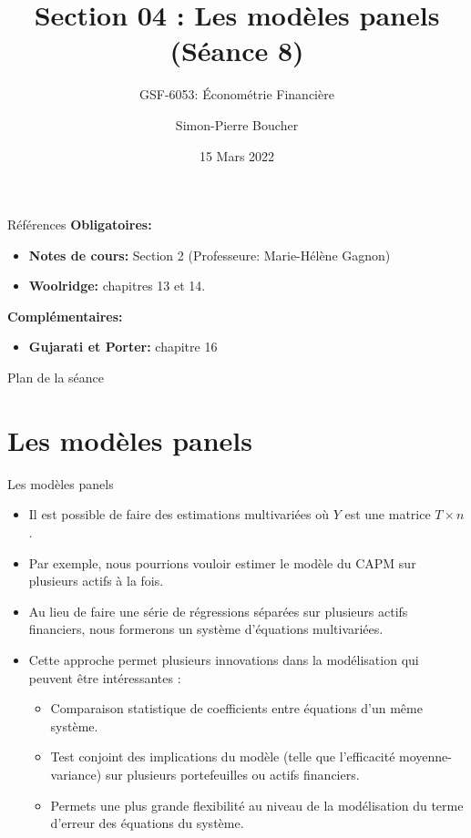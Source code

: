 \documentclass{beamer}
\title[S02 Régression et MCO]{Section 04 : Les modèles panels\\ (Séance 8)}
\subtitle{GSF-6053: Économétrie Financière}
\author[SP. Boucher]{Simon-Pierre Boucher\inst{1}}
\institute[Université Laval]
{
  \inst{1}%
  Département de finance, assurance et immobilier\\
  Faculté des sciences de l'administration\\
  Université Laval}
\date[Hiver 2022]{15 Mars 2022}
\begin{document}
\begin{frame}
  \titlepage
\end{frame}

\begin{frame}{Références}
\textbf{Obligatoires:}
\begin{itemize}
\item \textbf{Notes de cours:} Section 2 (Professeure: Marie-Hélène Gagnon)
\item \textbf{Woolridge:} chapitres 13 et 14.
\end{itemize}
\vspace{0.5cm}
\textbf{Complémentaires:}
\begin{itemize}
\item \textbf{Gujarati et Porter:} chapitre 16
\end{itemize}
\end{frame}

\begin{frame}{Plan de la séance}
  \tableofcontents
\end{frame}

\section{Les modèles panels}
\frame{\tableofcontents[current]}
\begin{frame}{Les modèles panels}
\begin{itemize}
\item Il est possible de faire des estimations multivariées où $Y$ est une matrice $T \times n$.
\item Par exemple, nous pourrions vouloir estimer le modèle du CAPM sur plusieurs actifs à la fois. 
\item Au lieu de faire une série de régressions séparées sur plusieurs actifs financiers, nous formerons un système d’équations multivariées.
\item Cette approche permet plusieurs innovations dans la modélisation qui peuvent être intéressantes :
\begin{itemize}
\item Comparaison statistique de coefficients entre équations d’un même système.
\item Test conjoint des implications du modèle (telle que l’efficacité moyenne-
variance) sur plusieurs portefeuilles ou actifs financiers.
\item Permets une plus grande flexibilité au niveau de la modélisation du terme
d’erreur des équations du système.
\end{itemize}
\end{itemize}
\end{frame}
\end{document}
